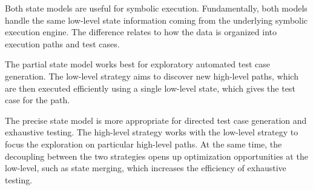 Both state models are useful for symbolic execution.
%
Fundamentally, both models handle the same low-level state information coming from the underlying symbolic execution engine.  The difference relates to how the data is organized into execution paths and test cases.

The partial state model works best for exploratory automated test case generation.
%
The low-level strategy aims to discover new high-level paths, which are then executed efficiently using a single low-level state, which gives the test case for the path.

The precise state model is more appropriate for directed test case generation and exhaustive testing.
%
The high-level strategy works with the low-level strategy to focus the exploration on particular high-level paths.  At the same time, the decoupling between the two strategies opens up optimization opportunities at the low-level, such as state merging, which increases the efficiency of exhaustive testing.




%


